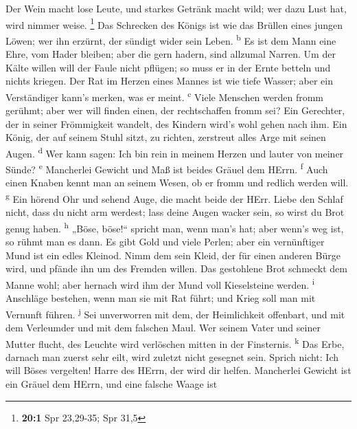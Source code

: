  Der Wein macht lose Leute, und starkes Getränk macht
wild; wer dazu Lust hat, wird nimmer weise. \footnote{\textbf{20:1} Spr
  23,29-35; Spr 31,5}  Das Schrecken des Königs ist wie
das Brüllen eines jungen Löwen; wer ihn erzürnt, der sündigt wider sein
Leben. \textsuperscript{b}  Es ist dem Mann eine Ehre, vom
Hader bleiben; aber die gern hadern, sind allzumal Narren.
 Um der Kälte willen will der Faule nicht pflügen; so muss
er in der Ernte betteln und nichts kriegen.  Der Rat im
Herzen eines Mannes ist wie tiefe Wasser; aber ein Verständiger kann's
merken, was er meint. \textsuperscript{c}  Viele Menschen
werden fromm gerühmt; aber wer will finden einen, der rechtschaffen
fromm sei?  Ein Gerechter, der in seiner Frömmigkeit
wandelt, des Kindern wird's wohl gehen nach ihm.  Ein
König, der auf seinem Stuhl sitzt, zu richten, zerstreut alles Arge mit
seinen Augen. \textsuperscript{d}  Wer kann sagen: Ich bin
rein in meinem Herzen und lauter von meiner Sünde? \textsuperscript{e}
 Mancherlei Gewicht und Maß ist beides Gräuel dem HErrn.
\textsuperscript{f}  Auch einen Knaben kennt man an
seinem Wesen, ob er fromm und redlich werden will. \textsuperscript{g}
 Ein hörend Ohr und sehend Auge, die macht beide der
HErr.  Liebe den Schlaf nicht, dass du nicht arm werdest;
lass deine Augen wacker sein, so wirst du Brot genug haben.
\textsuperscript{h}  „Böse, böse!{}`` spricht man, wenn
man's hat; aber wenn's weg ist, so rühmt man es dann.  Es
gibt Gold und viele Perlen; aber ein vernünftiger Mund ist ein edles
Kleinod.  Nimm dem sein Kleid, der für einen anderen
Bürge wird, und pfände ihn um des Fremden willen.  Das
gestohlene Brot schmeckt dem Manne wohl; aber hernach wird ihm der Mund
voll Kieselsteine werden. \textsuperscript{i}  Anschläge
bestehen, wenn man sie mit Rat führt; und Krieg soll man mit Vernunft
führen. \textsuperscript{j}  Sei unverworren mit dem, der
Heimlichkeit offenbart, und mit dem Verleumder und mit dem falschen
Maul.  Wer seinem Vater und seiner Mutter flucht, des
Leuchte wird verlöschen mitten in der Finsternis. \textsuperscript{k}
 Das Erbe, darnach man zuerst sehr eilt, wird zuletzt
nicht gesegnet sein.  Sprich nicht: Ich will Böses
vergelten! Harre des HErrn, der wird dir helfen. 
Mancherlei Gewicht ist ein Gräuel dem HErrn, und eine falsche Waage ist
